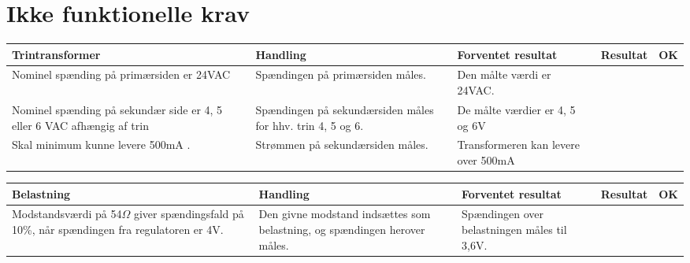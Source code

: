 \section{Ikke funktionelle krav}
\begin{table}[H]
	\centering
	\begin{tabular}{|p{4cm}|p{3cm}|p{3cm}|p{3cm}|p{1cm}|}
		\hline
		\textbf{Trintransformer} & \textbf{Handling} & \textbf{Forventet resultat} & \textbf{Resultat} &\textbf{OK} \\\hline
		Nominel spænding på primærsiden er 24VAC & Spændingen på primærsiden måles. & Den målte værdi er 24VAC. &  &  \\\hline
		Nominel spænding på sekundær side er 4, 5 eller 6 VAC afhængig af trin & Spændingen på sekundærsiden måles for hhv. trin 4, 5 og 6. & De målte værdier er 4, 5 og 6V &  & \\\hline
		Skal minimum kunne levere 500mA	. & Strømmen på sekundærsiden måles. & Transformeren kan levere over 500mA &   & \\\hline
	\end{tabular}
	
\end{table} 

\begin{table}[H]
	\centering
	\begin{tabular}{|p{4cm}|p{3cm}|p{3cm}|p{3cm}|p{1cm}|}
		\hline
		\textbf{Belastning} & \textbf{Handling} & \textbf{Forventet resultat} & \textbf{Resultat} &\textbf{OK} \\\hline
		Modstandsværdi på 54$\Omega$ giver spændingsfald på 10\%, når spændingen fra regulatoren er 4V. & Den givne modstand indsættes som belastning, og spændingen herover måles. & Spændingen over belastningen måles til 3,6V. &  &  \\\hline	
	\end{tabular}

	
\end{table}

